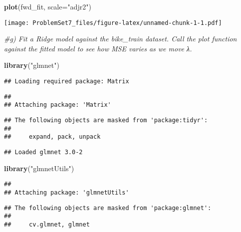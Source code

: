 \documentclass[]{article}
\newenvironment{Shaded}{\begin{snugshade}}{\end{snugshade}}
\newcommand{\CommentTok}[1]{\textcolor[rgb]{0.56,0.35,0.01}{\textit{#1}}}
\newcommand{\DataTypeTok}[1]{\textcolor[rgb]{0.13,0.29,0.53}{#1}}
\newcommand{\KeywordTok}[1]{\textcolor[rgb]{0.13,0.29,0.53}{\textbf{#1}}}
\newcommand{\NormalTok}[1]{#1}
\newcommand{\StringTok}[1]{\textcolor[rgb]{0.31,0.60,0.02}{#1}}
\begin{document}
\begin{Shaded}
\begin{Highlighting}[]
\KeywordTok{plot}\NormalTok{(fwd_fit, }\DataTypeTok{scale=}\StringTok{"adjr2"}\NormalTok{)}
\end{Highlighting}
\end{Shaded}

\texttt{[image: ProblemSet7\_files/figure-latex/unnamed-chunk-1-1.pdf]}

\begin{Shaded}
\begin{Highlighting}[]
\CommentTok{#g) Fit a Ridge model against the bike_train dataset. Call the plot function against the fitted model to see how MSE varies as we move λ.}
 
\KeywordTok{library}\NormalTok{(}\StringTok{"glmnet"}\NormalTok{)}
\end{Highlighting}
\end{Shaded}

\begin{verbatim}
## Loading required package: Matrix
\end{verbatim}

\begin{verbatim}
## 
## Attaching package: 'Matrix'
\end{verbatim}

\begin{verbatim}
## The following objects are masked from 'package:tidyr':
## 
##     expand, pack, unpack
\end{verbatim}

\begin{verbatim}
## Loaded glmnet 3.0-2
\end{verbatim}

\begin{Shaded}
\begin{Highlighting}[]
\KeywordTok{library}\NormalTok{(}\StringTok{"glmnetUtils"}\NormalTok{)}
\end{Highlighting}
\end{Shaded}

\begin{verbatim}
## 
## Attaching package: 'glmnetUtils'
\end{verbatim}

\begin{verbatim}
## The following objects are masked from 'package:glmnet':
## 
##     cv.glmnet, glmnet
\end{verbatim}
\end{document}
